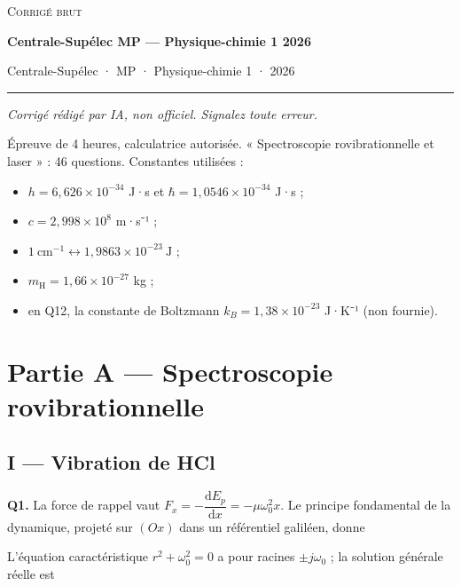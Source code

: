 \documentclass[11pt,a4paper]{article}
\providecommand{\tightlist}{\setlength{\itemsep}{0pt}\setlength{\parskip}{0pt}}
\newcommand{\equationajustee}[1]{%
  \sbox{\boiteequation}{$\displaystyle #1$}%
  \ifdim\wd\boiteequation>\linewidth
    \[\resizebox{\linewidth}{!}{\usebox{\boiteequation}}\]%
  \else
    \[#1\]%
  \fi}
\begin{document}
\thispagestyle{plain}
\begin{center}
  {\small\scshape Corrigé brut}\par\smallskip
  {\LARGE\bfseries Centrale-Supélec MP — Physique-chimie 1 2026\par}\medskip
  {\large Centrale-Supélec · MP · Physique-chimie 1 · 2026\par}
\end{center}
\vspace{2pt}\hrule\vspace{8pt}

\emph{Corrigé rédigé par IA, non officiel. Signalez toute erreur.}

Épreuve de 4 heures, calculatrice autorisée. « Spectroscopie rovibrationnelle et laser » : 46 questions. Constantes utilisées :

\begin{itemize}
\tightlist
\item
  \(h=6{,}626\times10^{-34}\) J·s et \(\hbar=1{,}0546\times10^{-34}\) J·s ;
\item
  \(c=2{,}998\times10^{8}\) m·s⁻¹ ;
\item
  \(1\ \mathrm{cm^{-1}}\leftrightarrow1{,}9863\times10^{-23}\ \mathrm J\) ;
\item
  \(m_{\mathrm H}=1{,}66\times10^{-27}\) kg ;
\item
  en Q12, la constante de Boltzmann \(k_B=1{,}38\times10^{-23}\) J·K⁻¹ (non fournie).
\end{itemize}

\hypertarget{partie-a-spectroscopie-rovibrationnelle}{%
\section{Partie A --- Spectroscopie rovibrationnelle}\label{partie-a-spectroscopie-rovibrationnelle}}

\hypertarget{i-vibration-de-hcl}{%
\subsection{I --- Vibration de HCl}\label{i-vibration-de-hcl}}

\textbf{Q1.} La force de rappel vaut \(F_x=-\dfrac{\mathrm dE_p}{\mathrm dx}=-\mu\omega_0^2x\). Le principe fondamental de la dynamique, projeté sur \((Ox)\) dans un référentiel galiléen, donne

\equationajustee{\boxed{\ddot x+\omega_0^2x=0}}

L'équation caractéristique \(r^2+\omega_0^2=0\) a pour racines \(\pm j\omega_0\) ; la solution générale réelle est
\end{document}
